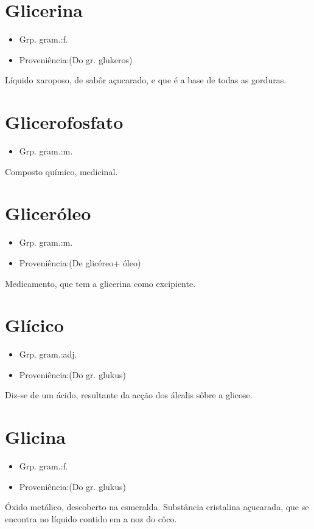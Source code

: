 \section{Glicerina}
\begin{itemize}
\item {Grp. gram.:f.}
\end{itemize}
\begin{itemize}
\item {Proveniência:(Do gr. \textunderscore glukeros\textunderscore )}
\end{itemize}
Líquido xaroposo, de sabôr açucarado, e que é a base de todas as gorduras.
\section{Glicerofosfato}
\begin{itemize}
\item {Grp. gram.:m.}
\end{itemize}
Composto químico, medicinal.
\section{Gliceróleo}
\begin{itemize}
\item {Grp. gram.:m.}
\end{itemize}
\begin{itemize}
\item {Proveniência:(De \textunderscore glicéreo\textunderscore  + \textunderscore óleo\textunderscore )}
\end{itemize}
Medicamento, que tem a glicerina como excipiente.
\section{Glícico}
\begin{itemize}
\item {Grp. gram.:adj.}
\end{itemize}
\begin{itemize}
\item {Proveniência:(Do gr. \textunderscore glukus\textunderscore )}
\end{itemize}
Diz-se de um ácido, resultante da acção dos álcalis sôbre a glicose.
\section{Glicina}
\begin{itemize}
\item {Grp. gram.:f.}
\end{itemize}
\begin{itemize}
\item {Proveniência:(Do gr. \textunderscore glukus\textunderscore )}
\end{itemize}
Óxido metálico, descoberto na esmeralda.
Substância cristalina açucarada, que se encontra no líquido contido em a noz do côco.
